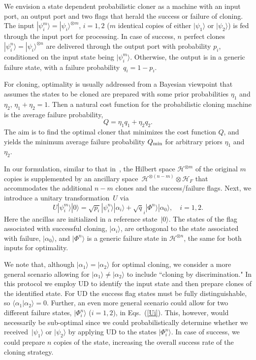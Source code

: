\documentclass[aps,prl,twocolumn,showpacs]{revtex4}
\newcommand{\ke}[1]{|#1\rangle}
\begin{document}
We envision a state dependent probabilistic cloner as a machine with an input port, an output port and two flags that herald the success or failure of cloning.  The input $|\psi_i^m\rangle=|\psi_i\rangle^{\otimes m}$, $i=1,2$ ($m$ identical copies of either $|\psi_1\rangle$ or $|\psi_2\rangle$) is fed through the input port for processing. In case of success, $n$ perfect clones~$|\psi_i^n\rangle=|\psi_i\rangle^{\otimes n}$ are delivered through the output port with probability $p_i$, conditioned on the input state being $|\psi^m_i\rangle$. Otherwise, the output is in a generic failure state, with a failure probability~$q_i=1-p_i$.

For cloning, optimality is usually addressed from a Bayesian viewpoint that assumes the states to be cloned are prepared with some prior probabilities $\eta_1$ and $\eta_2$, $\eta_1+\eta_2=1$. Then a natural cost function for the probabilistic cloning machine is the average failure probability, 
%
\begin{equation}
Q=\eta_1 q_1+\eta_2 q_2.
\label{obj fun}
\end{equation}
%
The aim is to find the optimal cloner that minimizes the cost function $Q$, and yields the minimum average failure probability $Q_{\rm min}$ for arbitrary priors $\eta_1$ and $\eta_2$.

In our formulation, similar to that in~\cite{DuanGuo}, the Hilbert space ${\mathscr H}^{\otimes m}$ of the original $m$ copies is supplemented by an ancillary space~${\mathscr H}^{\otimes(n-m)}\otimes {\mathscr H}_F$ that accommodates the additional $n-m$ clones and the success/failure flags. Next, we introduce a unitary transformation~$U$ via
%
\begin{equation}
U|\psi^m_i\rangle|0\rangle= \sqrt{p_i}|\psi^n_i\rangle|\alpha_i\rangle +\sqrt q_i |\Phi^{n}\rangle |\alpha_{0}\rangle,\quad i=1,2. \label{Ui}
\end{equation}
%
Here the ancillas are initialized in a reference state~$\ke 0$. The states of the flag associated with successful cloning, $\ke {\alpha_i}$, are orthogonal to the state associated with failure, $\ke{\alpha_{0}}$, and $\ke{\Phi^{n}}$ is a generic failure state in ${\mathscr H}^{\otimes n}$, the same for both inputs for optimality. 

We note that, although $|\alpha_1\rangle=|\alpha_2\rangle$ for optimal cloning, we consider a more general scenario allowing for $|\alpha_1\rangle \neq |\alpha_2\rangle$ to include ``cloning by discrimination." In this protocol we employ UD to identify the input state and then prepare clones of the identified state. For UD the success flag states must be fully distinguishable, so $\langle\alpha_1|\alpha_2\rangle=0$. Further, an even more general scenario could allow for two different failure states, $|\Phi_i^{n}\rangle$ ($i=1,2$), in Eqs.~(\ref{Ui}). This, however, would necessarily be sub-optimal since we could probabilistically determine whether we received~$\ke{\psi_1}$ or $\ke{\psi_2}$ by applying UD to the states $\ke {\Phi_i^{n}}$.  In case of success, we could prepare $n$ copies of the state, increasing the overall success rate of the cloning strategy.
\end{document}
